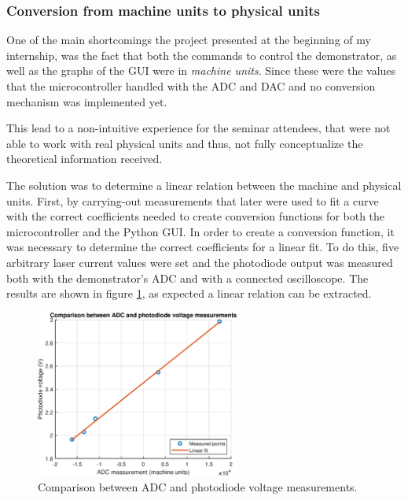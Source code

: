 \documentclass[a4paper,12pt]{article}
\newcounter{subsubsubsection}[subsubsection]
\begin{document}
\subsubsection{Conversion from machine units to physical units}
\label{section:physical_units}

One of the main shortcomings the project presented at the beginning of my internship, was the fact that both the commands to control the demonstrator, as well as the graphs of the GUI were in \textit{machine units}. Since these were the values that the microcontroller handled with the ADC and DAC and no conversion mechanism was implemented yet.

This lead to a non-intuitive experience for the seminar attendees, that were not able to work with real physical units and thus, not fully conceptualize the theoretical information received. 

The solution was to determine a linear relation between the machine and physical units. First, by carrying-out measurements that later were used to fit a curve with the correct coefficients needed to create conversion functions for both the microcontroller and the Python GUI.
\label{section:word_to_volt}
In order to create a conversion function, it was necessary to determine the correct coefficients for a linear fit. To do this, five arbitrary laser current values were set and the photodiode output was measured both with the demonstrator's ADC and with a connected oscilloscope. The results are shown in figure \ref{fig:word_to_volt}, as expected a linear relation can be extracted.

\begin{figure}[!h]
    \centering
    \includegraphics[width=0.6\textwidth]{Images/word_to_voltage.eps}
    \captionsetup{justification=centering}
    \caption{Comparison between ADC and photodiode voltage measurements.} 
    \label{fig:word_to_volt}
\end{figure}
\end{document}
